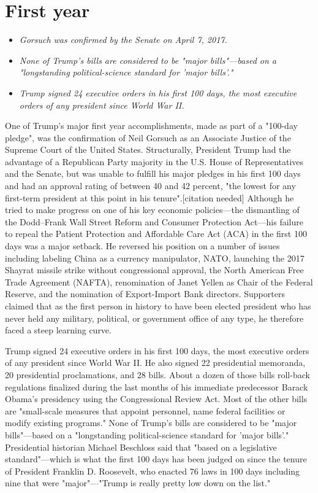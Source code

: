 \section{First year}\label{first-year}

\begin{itemize}
\item
  \emph{Gorsuch was confirmed by the Senate on April 7, 2017.}
\item
  \emph{None of Trump's bills are considered to be "major bills"---based
  on a "longstanding political-science standard for 'major bills'."}
\item
  \emph{Trump signed 24 executive orders in his first 100 days, the most
  executive orders of any president since World War II.}
\end{itemize}

One of Trump's major first year accomplishments, made as part of a
"100-day pledge", was the confirmation of Neil Gorsuch as an Associate
Justice of the Supreme Court of the United States. Structurally,
President Trump had the advantage of a Republican Party majority in the
U.S. House of Representatives and the Senate, but was unable to fulfill
his major pledges in his first 100 days and had an approval rating of
between 40 and 42 percent, "the lowest for any first-term president at
this point in his tenure".{[}citation needed{]} Although he tried to
make progress on one of his key economic policies---the dismantling of
the Dodd--Frank Wall Street Reform and Consumer Protection Act---his
failure to repeal the Patient Protection and Affordable Care Act (ACA)
in the first 100 days was a major setback. He reversed his position on a
number of issues including labeling China as a currency manipulator,
NATO, launching the 2017 Shayrat missile strike without congressional
approval, the North American Free Trade Agreement (NAFTA), renomination
of Janet Yellen as Chair of the Federal Reserve, and the nomination of
Export-Import Bank directors. Supporters claimed that as the first
person in history to have been elected president who has never held any
military, political, or government office of any type, he therefore
faced a steep learning curve.

Trump signed 24 executive orders in his first 100 days, the most
executive orders of any president since World War II. He also signed 22
presidential memoranda, 20 presidential proclamations, and 28 bills.
About a dozen of those bills roll-back regulations finalized during the
last months of his immediate predecessor Barack Obama's presidency using
the Congressional Review Act. Most of the other bills are "small-scale
measures that appoint personnel, name federal facilities or modify
existing programs." None of Trump's bills are considered to be "major
bills"---based on a "longstanding political-science standard for 'major
bills'." Presidential historian Michael Beschloss said that "based on a
legislative standard"---which is what the first 100 days has been judged
on since the tenure of President Franklin D. Roosevelt, who enacted 76
laws in 100 days including nine that were "major"---"Trump is really
pretty low down on the list."

